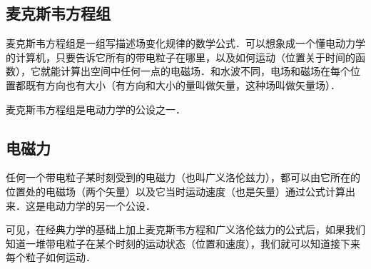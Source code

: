 \subsection{麦克斯韦方程组}
麦克斯韦方程组是一组写描述场变化规律的数学公式．可以想象成一个懂电动力学的计算机，只要告诉它所有的带电粒子在哪里，以及如何运动（位置关于时间的函数），它就能计算出空间中任何一点的电磁场．和水波不同，电场和磁场在每个位置都既有方向也有大小（有方向和大小的量叫做矢量，这种场叫做矢量场）．

麦克斯韦方程组是电动力学的公设之一．

\subsection{电磁力}
任何一个带电粒子某时刻受到的电磁力（也叫广义洛伦兹力），都可以由它所在的位置处的电磁场（两个矢量）以及它当时运动速度（也是矢量）通过公式计算出来．这是电动力学的另一个公设．

可见，在经典力学的基础上加上麦克斯韦方程和广义洛伦兹力的公式后，如果我们知道一堆带电粒子在某个时刻的运动状态（位置和速度），我们就可以知道接下来每个粒子如何运动．
